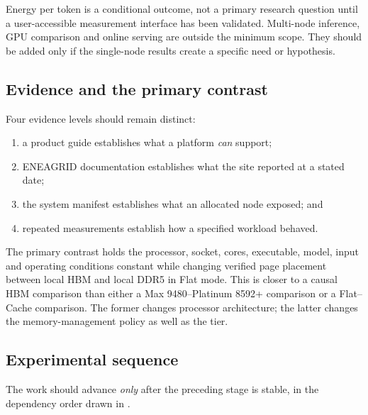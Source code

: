 Energy per token is a conditional outcome, not a primary research
question until a user-accessible measurement interface has been
validated.  Multi-node inference, GPU comparison and online serving are
outside the minimum scope.  They should be added only if the single-node
results create a specific need or hypothesis.


\subsection{Evidence and the primary contrast}

Four evidence levels should remain distinct:

\begin{enumerate}
  \item a product guide establishes what a platform \emph{can} support;
  \item ENEAGRID documentation establishes what the site reported at a
        stated date;
  \item the system manifest establishes what an allocated node exposed;
        and
  \item repeated measurements establish how a specified workload
        behaved.
\end{enumerate}

The primary contrast holds the processor, socket, cores, executable,
model, input and operating conditions constant while changing verified
page placement between local HBM and local DDR5 in Flat mode.  This is
closer to a causal HBM comparison than either a Max 9480--Platinum 8592+
comparison or a Flat--Cache comparison.  The former changes processor
architecture; the latter changes the memory-management policy as well
as the tier.

\subsection{Experimental sequence}

The work should advance \emph{only} after the preceding stage is
stable, in the dependency order drawn in
.

